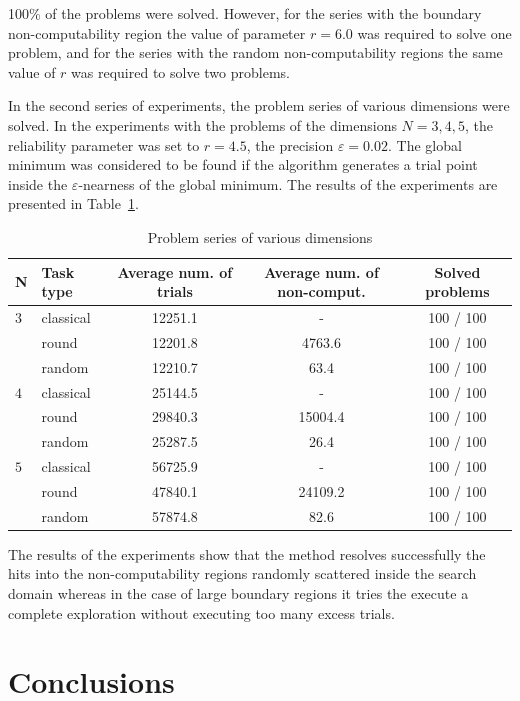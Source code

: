 \documentclass[runningheads]{llncs}
\begin{document}
100\% of the problems were solved. However, for the series with the boundary non-computability region the value of parameter $r=6.0$ was required to solve one problem, and for the series with the random non-computability regions the same value of $r$ was required to solve two problems.

In the second series of experiments, the problem series of various dimensions were solved. In the experiments with the problems of the dimensions $N=3,4,5$, the reliability parameter was set to $r=4.5$, the precision $\varepsilon=0.02$. The global minimum was considered to be found if the algorithm generates a trial point inside the $\varepsilon$-nearness of the global minimum. The results of the experiments are presented in Table~\ref{tab2}.

\begin{table}
\caption{Problem series of various dimensions}\label{tab2}
\begin{tabular}{|l|l|c|c|c|}
\hline
 N &  Task type & Average num. of trials & Average num. of non-comput. & Solved problems \\
\hline
$3$ & classical & 12251.1 & - & 100 / 100 \\
$ $ & round & 12201.8 & 4763.6 & 100 / 100 \\
$ $ & random & 12210.7 & 63.4 & 100 / 100 \\
\hline
$4$ & classical & 25144.5 & - & 100 / 100 \\
$ $ & round & 29840.3 & 15004.4  & 100 / 100 \\
$ $ & random & 25287.5 & 26.4 & 100 / 100 \\
\hline
$5$ & classical & 56725.9 & - & 100 / 100 \\
$ $ & round & 47840.1 & 24109.2 & 100 / 100\\
$ $ & random & 57874.8 & 82.6 & 100 / 100\\
\hline
\end{tabular}
\end{table}

The results of the experiments show that the method resolves successfully the hits into the non-computability regions randomly scattered inside the search domain whereas in the case of large boundary regions it tries the execute a complete exploration without executing too many excess trials.

\section{Conclusions}
\end{document}
